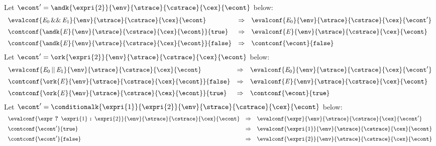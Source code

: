 \documentclass{article}
\begin{document}
\noindent
Let $\econt' = \andk{\expri{2}}{\env}{\strace}{\cstrace}{\cex}{\econt}$ below:
\[
  \begin{array}{lcl}
	\evalconf{\AndExpression{\expressionmeta_0}{\expressionmeta_1}}{\env}{\strace}{\cstrace}{\cex}{\econt}
	& \Rightarrow &
	\evalconf{\expressionmeta_0}{\env}{\strace}{\cstrace}{\cex}{\econt'}\\[2mm]

	\contconf{\andk{\expressionmeta}{\env}{\strace}{\cstrace}{\cex}{\econt}}{\true}
	& \Rightarrow &
	\evalconf{\expressionmeta}{\env}{\strace}{\cstrace}{\cex}{\econt}\\[2mm]

	\contconf{\andk{\expressionmeta}{\env}{\strace}{\cstrace}{\cex}{\econt}}{\false}
	& \Rightarrow &
	\contconf{\econt}{\false}\\
  \end{array}
\]
\noindent
Let $\econt' = \ork{\expri{2}}{\env}{\strace}{\cstrace}{\cex}{\econt}$ below:
\[
  \begin{array}{lcl}
	\evalconf{\OrExpression{\expressionmeta_0}{\expressionmeta_1}}{\env}{\strace}{\cstrace}{\cex}{\econt}
	& \Rightarrow &
	\evalconf{\expressionmeta_0}{\env}{\strace}{\cstrace}{\cex}{\econt'}\\[2mm]

	\contconf{\ork{\expressionmeta}{\env}{\strace}{\cstrace}{\cex}{\econt}}{\false}
	& \Rightarrow &
	\evalconf{\expressionmeta}{\env}{\strace}{\cstrace}{\cex}{\econt}\\[2mm]

	\contconf{\ork{\expressionmeta}{\env}{\strace}{\cstrace}{\cex}{\econt}}{\true}
	& \Rightarrow &
	\contconf{\econt}{\true}\\
  \end{array}
\]
\noindent
Let $\econt' = \conditionalk{\expri{1}}{\expri{2}}{\env}{\strace}{\cstrace}{\cex}{\econt}$ below:
\[
  \begin{array}{lcl}
	\evalconf{\expr \textbf{ ? } \expri{1} \textbf{ : } \expri{2}}{\env}{\strace}{\cstrace}{\cex}{\econt}
	& \Rightarrow &
	\evalconf{\expr}{\env}{\strace}{\cstrace}{\cex}{\econt'}\\[2mm]

	\contconf{\econt'}{\true}
	& \Rightarrow &
	\evalconf{\expri{1}}{\env}{\strace}{\cstrace}{\cex}{\econt}\\[2mm]

	\contconf{\econt'}{\false}
	& \Rightarrow &
	\evalconf{\expri{2}}{\env}{\strace}{\cstrace}{\cex}{\econt}\\[2mm]
  \end{array}
\]
\end{document}
